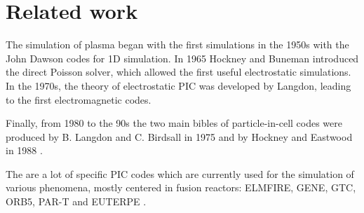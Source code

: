 \chapter{Related work}

The simulation of plasma began with the first simulations in the 1950s with the
John Dawson codes for 1D simulation. In 1965 Hockney and Buneman introduced the
direct Poisson solver, which allowed the first useful electrostatic simulations.
In the 1970s, the theory of electrostatic PIC was developed by Langdon, leading
to the first electromagnetic codes.

Finally, from 1980 to the 90s the two main bibles of particle-in-cell codes were
produced  by B. Langdon and C. Birdsall in 1975 \cite{birdsall} and by Hockney
and Eastwood in 1988 \cite{hockney}.

The are a lot of specific PIC codes which are currently used for the simulation
of various phenomena, mostly centered in fusion reactors: ELMFIRE, GENE, GTC,
ORB5, PAR-T and EUTERPE \cite{euterpe}.
